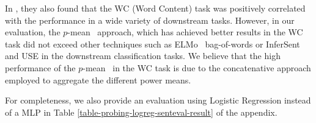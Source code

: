 \documentclass{article}
\begin{document}
In \cite{conneau2018you}, they also found that the WC (Word Content) task was positively correlated with the performance in a wide variety of downstream tasks. However, in our evaluation, the $p$-mean~\cite{DBLP:journals/corr/abs-1803-01400} approach, which has achieved better results in the WC task did not exceed other techniques such as ELMo~\cite{peters2018deep} bag-of-words or InferSent~\cite{conneau2017supervised} and USE in the downstream classification tasks. We believe that the high performance of the $p$-mean~\cite{DBLP:journals/corr/abs-1803-01400} in the WC task is due to the concatenative approach employed to aggregate the different power means.

For completeness, we also provide an evaluation using Logistic Regression instead of a MLP in Table \ref{table-probing-logreg-senteval-result} of the appendix.
\end{document}
